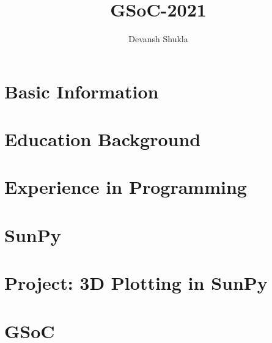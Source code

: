 \documentclass[a4paper, 10pt]{article}
\title{{\Large\textbf{GSoC-2021}}}
\author{Devansh Shukla}
\date{}
\numberwithin{equation}{section}
\begin{document}
	
	\maketitle

	\section{Basic Information}
		
	
	\section{Education Background}
		

	\section{Experience in Programming}
		

	\section{SunPy}
		
		
		
		

	\section{Project: 3D Plotting in SunPy}
		
		
		
		
			
	\section{GSoC}
		
	
	
\end{document}
